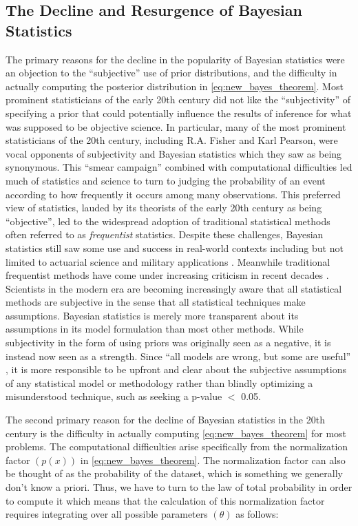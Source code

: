 \subsection*{The Decline and Resurgence of Bayesian Statistics}

The primary reasons for the decline in the popularity of Bayesian statistics were an objection to the ``subjective'' use of prior distributions, and the difficulty in actually computing the posterior distribution in \ref{eq:new_bayes_theorem}. Most prominent statisticians of the early 20th century did not like the ``subjectivity'' of specifying a prior that could potentially influence the results of inference for what was supposed to be objective science. In particular, many of the most prominent statisticians of the 20th century, including R.A. Fisher and Karl Pearson, were vocal opponents of subjectivity and Bayesian statistics which they saw as being synonymous. This ``smear campaign'' combined with computational difficulties led much of statistics and science to turn to judging the probability of an event according to how frequently it occurs among many observations. This preferred view of statistics, lauded by its theorists of the early 20th century as being ``objective'', led to the widespread adoption of traditional statistical methods often referred to as \textit{frequentist} statistics. Despite these challenges, Bayesian statistics still saw some use and success in real-world contexts including but not limited to actuarial science and military applications \cite{McGrayne2011}. Meanwhile traditional frequentist methods have come under increasing criticism in recent decades \cite{Ioannidis2005} \cite{Begley2015}. Scientists in the modern era are becoming increasingly aware that all statistical methods are subjective in the sense that all statistical techniques make assumptions. Bayesian statistics is merely more transparent about its assumptions in its model formulation than most other methods. While subjectivity in the form of using priors was originally seen as a negative, it is instead now seen as a strength. Since ``all models are wrong, but some are useful'' \cite{Box1976}, it is more responsible to be upfront and clear about the subjective assumptions of any statistical model or methodology rather than blindly optimizing a misunderstood technique, such as seeking a p-value $<$ 0.05.

The second primary reason for the decline of Bayesian statistics in the 20th century is the difficulty in actually computing \ref{eq:new_bayes_theorem} for most problems. The computational difficulties arise specifically from the normalization factor $(p(x))$ in \ref{eq:new_bayes_theorem}. The normalization factor can also be thought of as the probability of the dataset, which is something we generally don't know a priori. Thus, we have to turn to the law of total probability in order to compute it which means that the calculation of this normalization factor requires integrating over all possible parameters $(\theta)$ as follows:

